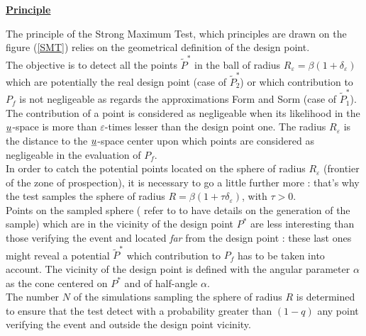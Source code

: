 {  \vspace{2mm}

  \underline{\textbf{Principle}} \vspace{2mm}

  The principle of the Strong Maximum Test, which principles are drawn on the figure (\ref{SMT}) relies on the geometrical definition of the design point. \\
  The objective is to detect all the points $\tilde{P}^*$ in the ball of radius $R_{\varepsilon} = \beta(1+\delta_{\varepsilon})$ which are potentially the real design point (case of $\tilde{P}_2^*$) or which contribution to $P_f$ is not negligeable as regards the approximations Form and Sorm (case of $\tilde{P}_1^*$). The contribution of a point is considered as negligeable when its likelihood in the ${\underline{u}}$-space is more than $\varepsilon$-times lesser than the design point one. The radius $R_{\varepsilon}$ is the distance to the ${\underline{u}}$-space center upon which points are considered as negligeable in the evaluation of $P_f$.\\
  In order to catch the potential points located on the sphere of radius $R_{\varepsilon}$ (frontier of the zone of prospection), it is necessary to go a little further more : that's why the test samples the sphere of radius  $R = \beta(1+\tau \delta_{\varepsilon})$, with $\tau >0$.\\
  Points on the sampled sphere ( refer to  to have details on the generation of the sample) which are in the vicinity of the design point $P^*$ are less interesting than those verifying the event and located {\itshape far} from the design point : these last ones might reveal a potential $\tilde{P}^*$ which contribution to $P_f$ has to be taken into account. The  vicinity of the design point is defined with the angular parameter $\alpha$ as the cone centered on $P^*$ and of half-angle $\alpha$.\\
  The number $N$ of the simulations sampling the sphere of radius $R$ is determined  to ensure that the test detect with a probability greater than $(1 - q)$ any point verifying the event and outside the design point vicinity.

}
